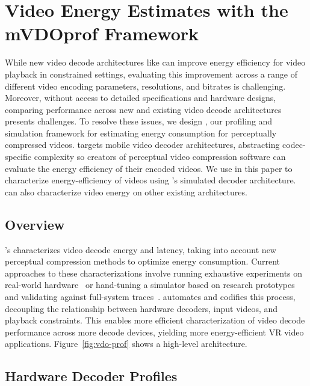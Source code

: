 \vdoprofOverview

\section{Video Energy Estimates with the {mVDOprof} Framework}
\label{sec:vdoprof}

While new video decode architectures like \nameArch can improve energy efficiency for video playback in constrained settings, evaluating this improvement across a range of different video encoding parameters, resolutions, and bitrates is challenging.
Moreover, without access to detailed specifications and hardware designs, comparing performance across new and existing video decode architectures presents challenges.
To resolve these issues, we design \nameArchprof, our profiling and simulation framework for estimating energy consumption for perceptually compressed videos.
\nameArchprof targets mobile video decoder architectures, abstracting codec-specific complexity so creators of perceptual video compression software can evaluate the energy efficiency of their encoded videos.
We use \nameArchprof in this paper to characterize energy-efficiency of videos using \nameArch's simulated decoder architecture. \nameArchprof can also characterize video energy on other existing architectures.


\subsection{\nameArchprof Overview}
\nameArchprof's characterizes video decode energy and latency, taking into account new perceptual compression methods to optimize energy consumption.
Current approaches to these characterizations involve running exhaustive experiments on real-world hardware~\cite{evr19isca} or hand-tuning a simulator based on research prototypes and validating against full-system traces~\cite{zhang2017race}.
\nameArchprof automates and codifies this process, decoupling the relationship between hardware decoders, input videos, and playback constraints.
This enables more efficient characterization of video decode performance across more decode devices, yielding more energy-efficient VR video applications.
Figure~\ref{fig:vdo-prof} shows a high-level \nameArchprof architecture.

\subsection{Hardware Decoder Profiles}
\label{subsec:profiles}

